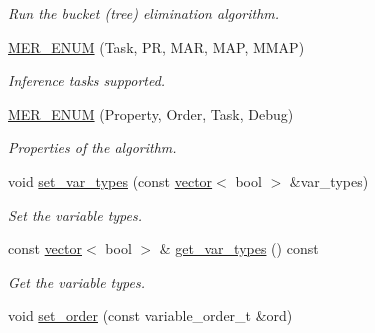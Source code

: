 \begin{DoxyCompactItemize}
\begin{DoxyCompactList}\small\item\em Run the bucket (tree) elimination algorithm. \end{DoxyCompactList}\item 
\hyperlink{classmerlin_1_1bte_aecde6cf626a5d247bd6d88b17ea1909b}{M\+E\+R\+\_\+\+E\+N\+UM} (Task, PR, M\+AR, M\+AP, M\+M\+AP)\hypertarget{classmerlin_1_1bte_aecde6cf626a5d247bd6d88b17ea1909b}{}\label{classmerlin_1_1bte_aecde6cf626a5d247bd6d88b17ea1909b}

\begin{DoxyCompactList}\small\item\em Inference tasks supported. \end{DoxyCompactList}\item 
\hyperlink{classmerlin_1_1bte_a9ded3cefca0377f2abd4af1ca33f35ec}{M\+E\+R\+\_\+\+E\+N\+UM} (Property, Order, Task, Debug)\hypertarget{classmerlin_1_1bte_a9ded3cefca0377f2abd4af1ca33f35ec}{}\label{classmerlin_1_1bte_a9ded3cefca0377f2abd4af1ca33f35ec}

\begin{DoxyCompactList}\small\item\em Properties of the algorithm. \end{DoxyCompactList}\item 
void \hyperlink{classmerlin_1_1bte_a90ff2e31f56ef45718941ef50a38a8cf}{set\+\_\+var\+\_\+types} (const \hyperlink{classmerlin_1_1vector}{vector}$<$ bool $>$ \&var\+\_\+types)\hypertarget{classmerlin_1_1bte_a90ff2e31f56ef45718941ef50a38a8cf}{}\label{classmerlin_1_1bte_a90ff2e31f56ef45718941ef50a38a8cf}

\begin{DoxyCompactList}\small\item\em Set the variable types. \end{DoxyCompactList}\item 
const \hyperlink{classmerlin_1_1vector}{vector}$<$ bool $>$ \& \hyperlink{classmerlin_1_1bte_a86e7db0c8ce206b70e5ec8c0333cfab6}{get\+\_\+var\+\_\+types} () const \hypertarget{classmerlin_1_1bte_a86e7db0c8ce206b70e5ec8c0333cfab6}{}\label{classmerlin_1_1bte_a86e7db0c8ce206b70e5ec8c0333cfab6}

\begin{DoxyCompactList}\small\item\em Get the variable types. \end{DoxyCompactList}\item 
void \hyperlink{classmerlin_1_1bte_adf4961408c6514d8890ea33692eebee8}{set\+\_\+order} (const variable\+\_\+order\+\_\+t \&ord)\hypertarget{classmerlin_1_1bte_adf4961408c6514d8890ea33692eebee8}{}\label{classmerlin_1_1bte_adf4961408c6514d8890ea33692eebee8}


\end{DoxyCompactItemize}
